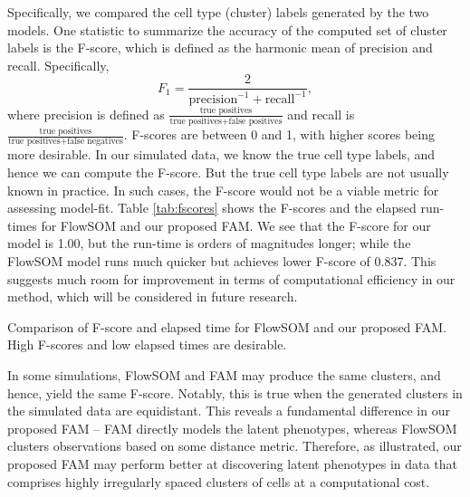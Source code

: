 \documentclass[12pt,]{article}
\begin{document}
Specifically, we compared the cell type (cluster) labels generated by the two
models.
One statistic to summarize the accuracy of the computed set of cluster labels
is the F-score, which is defined as the harmonic mean of precision and recall.
Specifically,
$$
F_1 = \frac{2}{\text{precision}^{-1} + \text{recall}^{-1}},
$$
where precision is defined as $\frac{\text{true positives}}{\text{true
positives} + \text{false positives}}$ and recall is $\frac{\text{true
positives}}{\text{true positives} + \text{false negatives}}$.  F-scores are
between 0 and 1, with higher scores being more desirable. In our simulated
data, we know the true cell type labels, and hence we can compute the F-score.
But the true cell type labels are not usually known in practice. In such cases,
the F-score would not be a viable metric for assessing model-fit.  Table
\ref{tab:fscores} shows the F-scores and the elapsed run-times for FlowSOM and
our proposed FAM.  We see that the F-score for our model is 1.00, but the
run-time is orders of magnitudes longer; while the FlowSOM model runs much
quicker but achieves lower F-score of 0.837. This suggests much room for
improvement in terms of computational efficiency in our method, which will be
considered in future research.


\begin{table}[H]
\centering

\label{tab:fscores}
\caption{Comparison of F-score and elapsed time for FlowSOM and our proposed
FAM. High F-scores and low elapsed times are desirable.}
\end{table}

In some simulations, FlowSOM and FAM may produce the same clusters, and hence,
yield the same F-score. Notably, this is true when the generated clusters in
the simulated data are equidistant. This reveals a fundamental difference in
our proposed FAM -- FAM directly models the latent phenotypes, whereas FlowSOM
clusters observations based on some distance metric. Therefore, as illustrated,
our proposed FAM may perform better at discovering latent phenotypes in data
that comprises highly irregularly spaced clusters of cells at a computational
cost.
\end{document}
